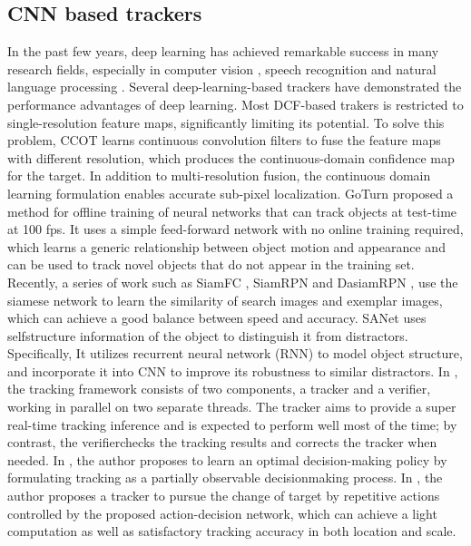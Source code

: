 \documentclass[review]{elsarticle}
\begin{document}
\subsection{CNN based trackers}
In the past few years, deep learning \cite{Goodfellow2015DeepL} has achieved remarkable success in many research fields, especially in computer vision \cite{Girshick2016RegionBasedCN, Schroff2015FaceNetAU}, speech recognition \cite{Kim2016JointCB, Wu2015DeepNN} and natural language processing \cite{Vinyals2014GrammarAA, Bahdanau2014NeuralMT}. Several deep-learning-based trackers have demonstrated the performance advantages of deep learning. 
Most DCF-based trakers is restricted to single-resolution feature maps, significantly limiting its potential. To solve this problem, CCOT \cite{Danelljan2016BeyondCF} learns continuous convolution filters to fuse the feature maps with different resolution, which produces the continuous-domain confidence map for the target. In addition to multi-resolution fusion, the continuous domain learning formulation enables accurate sub-pixel localization.
GoTurn \cite{held2016learning} proposed a method for offline training of neural networks that can track objects at test-time at 100 fps. It uses a simple feed-forward network with no online training required, which learns a generic relationship between object motion and appearance and can be used to track novel objects that do not appear in the training set. 
Recently, a series of work such as SiamFC \cite{bertinetto2016fully}, SiamRPN \cite{Li2018HighPV} and DasiamRPN \cite{zhu2018distractor}, use the siamese network to learn the similarity of search images and exemplar images, which can achieve a good balance between speed and accuracy. 
SANet \cite{Fan2016SANetSN} uses selfstructure information of the object to distinguish it from distractors. Specifically, It utilizes recurrent neural network (RNN) to model object structure, and incorporate it into CNN to improve its robustness to similar distractors. 
In \cite{fan2017parallel}, the tracking framework consists of two components, a tracker and a verifier, working in parallel on two separate threads. The tracker aims to provide a super real-time tracking inference and is expected to perform well most of the time; by contrast, the verifierchecks the tracking results and corrects the tracker when needed. 
In \cite{supancic2017tracking}, the author proposes to learn an optimal decision-making policy by formulating tracking as a partially observable decisionmaking process. 
In \cite{yun2017action}, the author proposes a tracker to pursue the change of target by repetitive actions controlled by the proposed action-decision network, which can achieve a light computation as well as satisfactory tracking accuracy in both location and scale.
\end{document}
